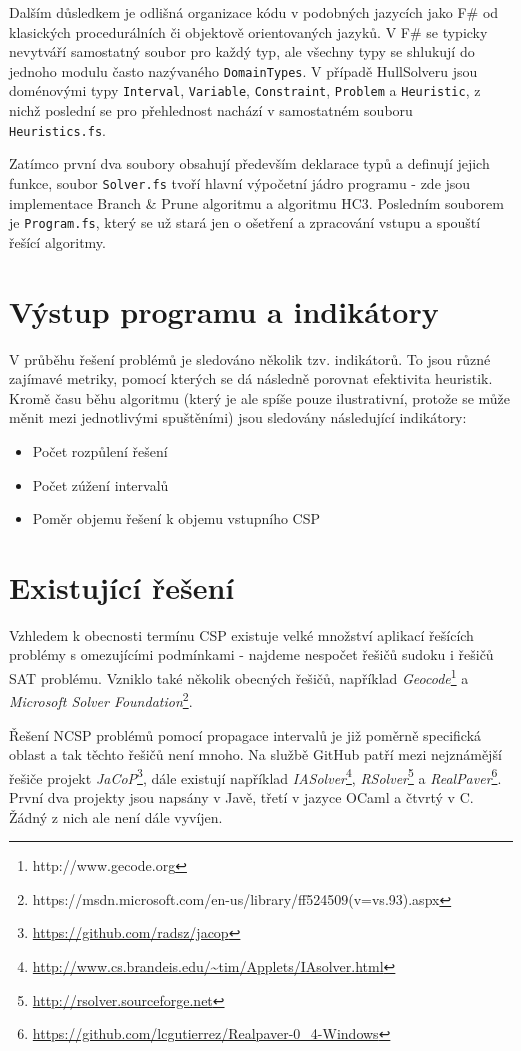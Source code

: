 Dalším důsledkem je odlišná organizace kódu v podobných jazycích jako F\# od klasických procedurálních či objektově orientovaných jazyků. V F\# se typicky nevytváří samostatný soubor pro každý typ, ale všechny typy se shlukují do jednoho modulu často nazývaného \verb|DomainTypes|. V případě HullSolveru jsou doménovými typy \verb|Interval|, \verb|Variable|, \verb|Constraint|, \verb|Problem| a \verb|Heuristic|, z nichž poslední se pro přehlednost nachází v samostatném souboru \verb|Heuristics.fs|.

Zatímco první dva soubory obsahují především deklarace typů a definují jejich funkce, soubor \verb|Solver.fs| tvoří hlavní výpočetní jádro programu - zde jsou implementace Branch \& Prune algoritmu a algoritmu HC3. Posledním souborem je \verb|Program.fs|, který se už stará jen o ošetření a zpracování vstupu a spouští řešící algoritmy.

\section{Výstup programu a indikátory}
V průběhu řešení problémů je sledováno několik tzv. indikátorů. To jsou různé zajímavé metriky, pomocí kterých se dá následně porovnat efektivita heuristik. Kromě času běhu algoritmu (který je ale spíše pouze ilustrativní, protože se může měnit mezi jednotlivými spuštěními) jsou sledovány následující indikátory:

\begin{itemize}
    \item Počet rozpůlení řešení
    \item Počet zúžení intervalů
    \item Poměr objemu řešení k objemu vstupního CSP
\end{itemize}


\section{Existující řešení}
Vzhledem k obecnosti termínu CSP existuje velké množství aplikací řešících problémy s omezujícími podmínkami - najdeme nespočet řešičů sudoku i řešičů SAT problému. Vzniklo také několik obecných řešičů, například \emph{Geocode}\footnote{http://www.gecode.org} a \emph{Microsoft Solver Foundation}\footnote{https://msdn.microsoft.com/en-us/library/ff524509(v=vs.93).aspx}.

Řešení NCSP problémů pomocí propagace intervalů je již poměrně specifická oblast a tak těchto řešičů není mnoho. Na službě GitHub patří mezi nejznámější řešiče projekt \emph{JaCoP}\footnote{\url{https://github.com/radsz/jacop}}, dále existují například \emph{IASolver}\footnote{\url{http://www.cs.brandeis.edu/~tim/Applets/IAsolver.html}}, \emph{RSolver}\footnote{\url{http://rsolver.sourceforge.net}} a \emph{RealPaver}\footnote{\url{https://github.com/lcgutierrez/Realpaver-0\_4-Windows}}. První dva projekty jsou napsány v Javě, třetí v jazyce OCaml a čtvrtý v C. Žádný z nich ale není dále vyvíjen.
